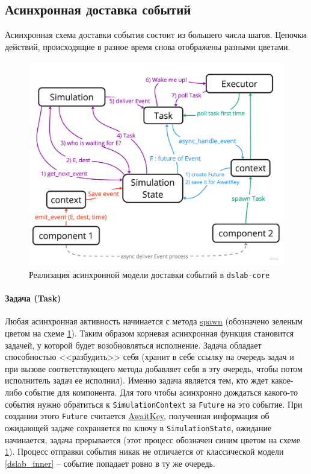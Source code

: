 \subsection{Асинхронная доставка событий}
Асинхронная схема доставки события состоит из большего числа шагов. Цепочки действий, происходящие в разное время снова отображены разными цветами. 
\nopagebreak
\begin{figure}[H]
    \centering
    \includegraphics[width=\linewidth]{images/async-dslab-core-new.pdf}
    \caption{Реализация асинхронной модели доставки событий в \texttt{dslab-core}}
    \label{async_dslab_inner}
\end{figure}

\paragraph{Задача (Task)}
Любая асинхронная активность начинается с метода \hyperref[spawn]{spawn} (обозначено зеленым цветом на схеме \ref{async_dslab_inner}). Таким образом корневая асинхронная функция становится задачей, у которой будет возобновляться исполнение. Задача обладает способностью <<разбудить>> себя (хранит в себе ссылку на очередь задач и при вызове соответствующего метода добавляет себя в эту очередь, чтобы потом исполнитель задач ее исполнил). Именно задача является тем, кто ждет какое-либо событие для компонента. Для того чтобы асинхронно дождаться какого-то события нужно обратиться к \texttt{SimulationContext} за \texttt{Future} на это событие. При создании этого \texttt{Future} считается \hyperref[awaitkey]{AwaitKey}, полученная информация об ожидающей задаче сохраняется по ключу в \texttt{SimulationState}, ожидание начинается, задача прерывается (этот процесс обозначен синим цветом на схеме \ref{async_dslab_inner}). Процесс отправки события никак не отличается от классической модели \ref{dslab_inner}  -- событие попадает ровно в ту же очередь.

